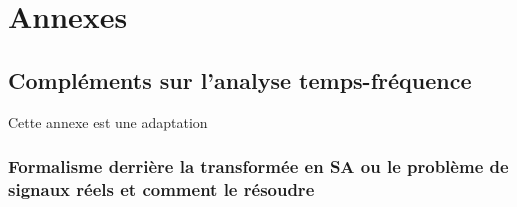\section{Annexes}

\subsection{Compléments sur l'analyse temps-fréquence}\label{ann:complement_t-f}

Cette annexe est une adaptation 

\subsubsection{\wip Formalisme derrière la transformée en SA ou le problème de signaux réels et comment le résoudre}\label{sec:transfo_SA}

